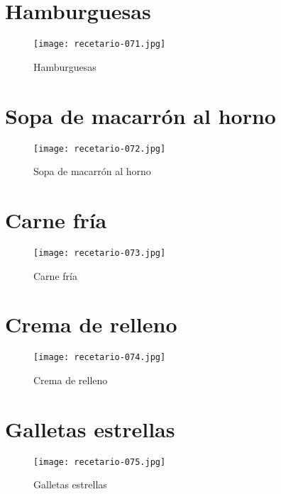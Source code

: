 \documentclass[12pt,letterpaper]{article}
\begin{document}
\newpage

\section{Hamburguesas}
  \begin{figure}[H]
    \vspace{2pt}
  \texttt{[image: recetario-071.jpg]}
    \caption{Hamburguesas}
    
  \end{figure}

\newpage

\section{Sopa de macarrón al horno}
  \begin{figure}[H]
    \vspace{2pt}
  \texttt{[image: recetario-072.jpg]}
    \caption{Sopa de macarrón al horno}
    
  \end{figure}

\newpage

\section{Carne fría}
  \begin{figure}[H]
    \vspace{2pt}
  \texttt{[image: recetario-073.jpg]}
    \caption{Carne fría}
    
  \end{figure}

\newpage

\section{Crema de relleno}
  \begin{figure}[H]
    \vspace{2pt}
  \texttt{[image: recetario-074.jpg]}
    \caption{Crema de relleno}
    
  \end{figure}

\newpage

\section{Galletas estrellas}
  \begin{figure}[H]
    \vspace{2pt}
  \texttt{[image: recetario-075.jpg]}
    \caption{Galletas estrellas}
    
  \end{figure}
\end{document}

